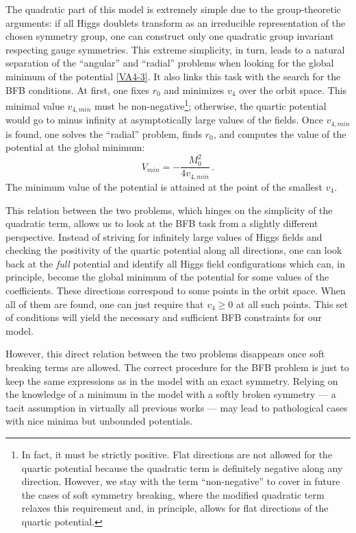 \documentclass[11pt]{article}
\begin{document}
The quadratic part of this model is extremely simple due to the group-theoretic arguments:
if all Higgs doublets transform as an irreducible representation of the chosen symmetry group, 
one can construct only one quadratic group invariant respecting gauge symmetries.
This extreme simplicity, in turn, leads to a natural separation of the ``angular'' and ``radial''
problems when looking for the global minimum of the potential \eqref{VA4-3}.
It also links this task with the search for the BFB conditions. 
At first, one fixes $r_0$ and minimizes $v_4$ over the orbit space. This minimal value $v_{4, min}$ must be non-negative\footnote{In fact, it must be strictly positive.
Flat directions are not allowed for the quartic potential because the quadratic term is definitely negative along any direction.
However, we stay with the term ``non-negative'' to cover in future the cases of soft symmetry breaking,
where the modified quadratic term relaxes this requirement and, in principle, allows for flat directions
of the quartic potential.};
otherwise, the quartic potential would go to minus infinity at asymptotically large values of the fields.
Once $v_{4, min}$ is found, one solves the ``radial'' problem, finds $r_0$, and computes the value of the
potential at the global minimum:
\begin{equation}
V_{min} = -\frac{M_0^2}{4v_{4, min}}\,.
\end{equation}
The minimum value of the potential is attained at the point of the smallest $v_4$.

This relation between the two problems, which hinges on the simplicity of the quadratic term,
allows us to look at the BFB task from a slightly different perspective.
Instead of striving for infinitely large values of Higgs fields and checking the positivity of the quartic potential 
along all directions, one can look back at the {\em full} potential and identify all Higgs field configurations
which can, in principle, become the global minimum of the potential for some values of the coefficients.
These directions correspond to some points in the orbit space.
When all of them are found, one can just require that $v_4 \ge 0$ at all such points. 
This set of conditions will yield the necessary and sufficient BFB constraints for our model.

However, this direct relation between the two problems disappears once soft breaking terms are allowed.
The correct procedure for the BFB problem is just to keep the same expressions as in the model with an exact symmetry.
Relying on the knowledge of a minimum in the model with a softly broken symmetry --- a tacit assumption in virtually all previous works 
--- may lead to pathological cases with nice minima but unbounded potentials. 
\end{document}
